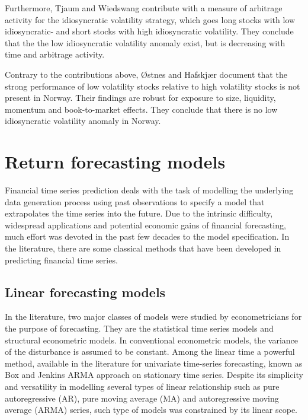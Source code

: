 Furthermore, Tjaum and Wiedswang \cite{thaumwiedswang} contribute with a measure of arbitrage activity for the idiosyncratic volatility strategy, which goes long stocks with low idiosyncratic- and short stocks with high idiosyncratic volatility. They conclude that the the low idiosyncratic volatility anomaly exist, but is decreasing with time and arbitrage activity. 

Contrary to the contributions above, Østnes and Hafskjær \cite{ostnes} document that the strong performance of low volatility stocks relative to high volatility stocks is not present in Norway. Their findings are robust for exposure to size, liquidity, momentum and book-to-market effects. They conclude that there is no low idiosyncratic volatility anomaly in Norway.


\section{Return forecasting models}

Financial time series prediction deals with the task of modelling the underlying data generation process using past observations to specify a model that extrapolates the time series into the future. Due to the intrinsic difficulty, widespread applications and potential economic gains of financial forecasting, much effort was devoted in the past few decades to the model specification. In the literature, there are some classical methods that have been developed in predicting financial time series. 

\subsection{Linear forecasting models}

In the literature, two major classes of models were studied by econometricians for the purpose of forecasting. They are the statistical time series models and structural econometric models. In conventional econometric models, the variance of the disturbance is assumed to be constant.  Among the linear time a powerful method, available in the literature for univariate time-series forecasting, known as Box and Jenkins \cite{B&J} ARMA approach on stationary time series. Despite its simplicity and versatility in modelling several types of linear relationship such as pure autoregressive (AR), pure moving average (MA) and autoregressive moving average (ARMA) series, such type of models was constrained by its linear scope. 

